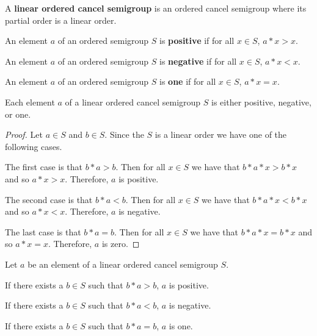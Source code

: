 \begin{definition}\label{def:LinearOrderedCancelSemigroup}\leanok
{}
A \textbf{linear ordered cancel semigroup} is an ordered cancel semigroup where its partial order is a linear order.
\end{definition}

\begin{definition}\label{def:positive}\leanok
{}
An element $a$ of an ordered semigroup $S$ is \textbf{positive} if for all $x\in S$, $a*x > x$.
\end{definition}

\begin{definition}\label{def:negative}\leanok
{}
An element $a$ of an ordered semigroup $S$
is \textbf{negative} if for all $x\in S$, $a*x < x$.
\end{definition}

\begin{definition}\label{def:one}\leanok
{}
An element $a$ of an ordered semigroup $S$
is \textbf{one} if for all $x\in S$, $a*x = x$.
\end{definition}

\begin{theorem}\label{thm:pos_neg_or_one}\leanok
{}
Each element $a$ of a linear ordered cancel semigroup $S$ is either positive, negative, or one.
\end{theorem}
\begin{proof}
Let $a\in S$ and $b\in S$. Since the $S$ is a linear order we have one of the following cases.

The first case is that $b * a > b$. Then for all $x\in S$ we have that $b * a * x > b * x$
and so $a * x > x$. Therefore, $a$ is positive.

The second case is that $b * a < b$. Then for all $x\in S$ we have that $b * a * x < b * x$
and so $a * x < x$. Therefore, $a$ is negative.

The last case is that $b * a = b$. Then for all $x\in S$ we have that $b * a * x = b * x$
and so $a * x = x$. Therefore, $a$ is zero.
\end{proof}

\begin{corollary}\label{lem:right_forall}\leanok
{}
Let $a$ be an element of a linear ordered cancel semigroup $S$. 

If there exists a $b\in S$ such that $b * a > b$, $a$ is positive.

If there exists a $b\in S$ such that $b * a < b$, $a$ is negative.

If there exists a $b\in S$ such that $b * a = b$, $a$ is one.
\end{corollary}

